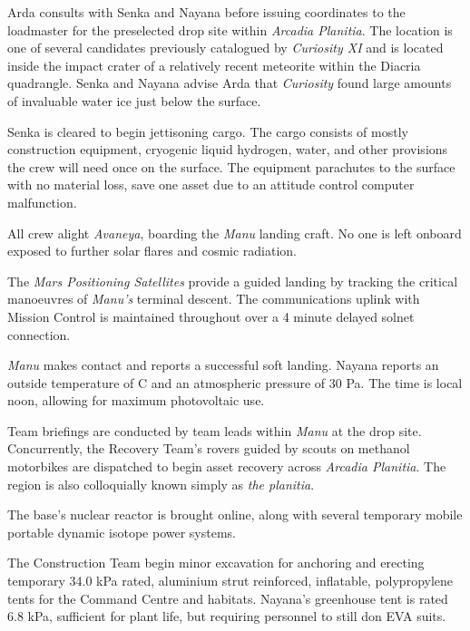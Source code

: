 

Arda consults with Senka and Nayana before issuing coordinates to the loadmaster for the preselected drop site within {\it Arcadia Planitia}. The location is one of several candidates previously catalogued by {\it Curiosity XI} and is located inside the impact crater of a relatively recent meteorite within the Diacria quadrangle. Senka and Nayana advise Arda that {\it Curiosity} found large amounts of invaluable water ice just below the surface. 

Senka is cleared to begin jettisoning cargo. The cargo consists of mostly construction equipment, cryogenic liquid hydrogen, water, and other provisions the crew will need once on the surface. The equipment parachutes to the surface with no material loss, save one asset due to an attitude control computer malfunction.
\StopTimelineDate

All crew alight {\it Avaneya}, boarding the {\it Manu} landing craft. No one is left onboard exposed to further solar flares and cosmic radiation.

The {\it Mars Positioning Satellites} provide a guided landing by tracking the critical manoeuvres of {\it Manu's} terminal descent. The communications uplink with Mission Control is maintained throughout over a 4 minute delayed solnet connection.

{\it Manu} makes contact and reports a successful soft landing. Nayana reports an outside temperature of C and an atmospheric pressure of 30 Pa. The time is local noon, allowing for maximum photovoltaic use.

Team briefings are conducted by team leads within {\it Manu} at the drop site. Concurrently, the Recovery Team's rovers guided by scouts on methanol motorbikes are dispatched to begin asset recovery across {\it Arcadia Planitia}. The region is also colloquially known simply as {\it the planitia}.

The base's nuclear reactor is brought online, along with several temporary mobile portable dynamic isotope power systems.

The Construction Team begin minor excavation for anchoring and erecting temporary 34.0 kPa rated, aluminium strut reinforced, inflatable, polypropylene tents for the Command Centre and habitats. Nayana's greenhouse tent is rated 6.8 kPa, sufficient for plant life, but requiring personnel to still don EVA suits.
\StopTimelineDate

